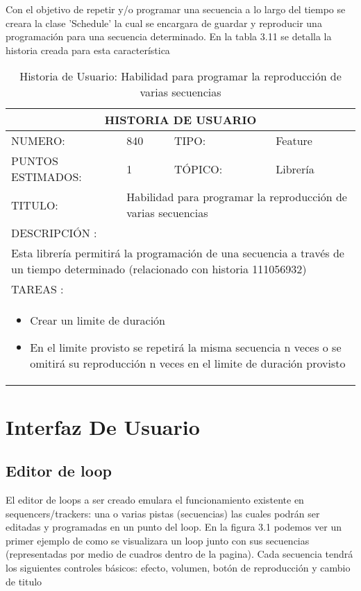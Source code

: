 Con el objetivo de repetir y/o programar una secuencia a lo largo del tiempo se
creara la clase 'Schedule' la cual se encargara de guardar y reproducir una
programación para una secuencia determinado. En la tabla 3.11 se detalla la
historia creada para esta característica

\begin{table}[h]
\centering
\renewcommand{\arraystretch}{1.4}
\begin{tabular}{|*{4}{l|}}
\hline
\multicolumn{4}{|c|}{HISTORIA DE USUARIO} \\ \hline
NUMERO: & 840 & TIPO: & Feature \\ \hline
PUNTOS ESTIMADOS: & 1 & TÓPICO: & Librería \\ \hline
TITULO: & \multicolumn{3}{|p{7.2cm}|}{ Habilidad para programar la reproducción de varias secuencias} \\ \hline
\multicolumn{4}{|l|}{DESCRIPCIÓN : } \\ \hline
\multicolumn{4}{|p{11cm}|}{Esta librería permitirá la programación de una secuencia a través de un tiempo determinado (relacionado con historia 111056932)} \\ \hline
\multicolumn{4}{|l|}{TAREAS : } \\ \hline
\multicolumn{4}{|p{11cm}|}{
\begin{minipage}[t]{\hsize}
  \begin{itemize}
    \item Crear un limite de duración
    \item En el limite provisto se repetirá la misma secuencia n veces o se omitirá su reproducción n veces en el limite de duración provisto
  \end{itemize}
\end{minipage}
} \\ \hline
\end{tabular}
\caption{Historia de Usuario: Habilidad para programar la reproducción de varias secuencias}
\label{tab:Primero}
\end{table}

\section{Interfaz De Usuario}

\subsection{Editor de loop}

El editor de loops a ser creado emulara el funcionamiento existente en
sequencers/trackers: una o varias pistas (secuencias) las cuales podrán
ser editadas y programadas en un punto del loop.
En la figura 3.1 podemos ver un primer ejemplo de como se visualizara un loop
junto con sus secuencias (representadas por medio de cuadros dentro de
la pagina). Cada secuencia tendrá los siguientes controles básicos: efecto,
volumen, botón de reproducción y cambio de titulo

